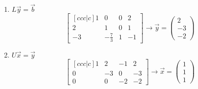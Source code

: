 \documentclass[10pt]{article}
\begin{document}
\begin{multicols}{2}
\begin{minipage}{0.95\columnwidth}
        \begin{enumerate}
            \item \(L\overrightarrow{y} = \overrightarrow{b}\) \begin{equation*}
                      \begin{bmatrix}[ccc|c]
                          1  & 0            & 0 & 2  \\
                          2  & 1            & 0 & 1  \\
                          -3 & -\frac{7}{3} & 1 & -1
                      \end{bmatrix}
                      \rightarrow
                      \overrightarrow{y} = \begin{pmatrix}
                          2  \\
                          -3 \\
                          -2
                      \end{pmatrix}
                  \end{equation*}
            \item \(U \overrightarrow{x} = \overrightarrow{y}\) \begin{equation*}
                      \begin{bmatrix}[ccc|c]
                          1 & 2  & -1 & 2  \\
                          0 & -3 & 0  & -3 \\
                          0 & 0  & -2 & -2
                      \end{bmatrix}
                      \rightarrow \overrightarrow{x} = \begin{pmatrix}
                          1 \\
                          1 \\
                          1
                      \end{pmatrix}
                  \end{equation*}
        \end{enumerate}


\end{minipage}
\end{multicols}
\end{document}
